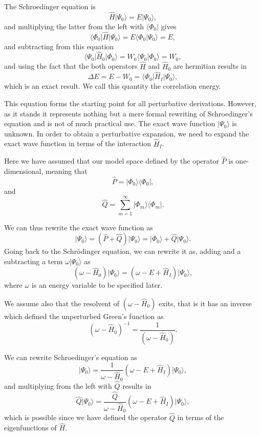 The Schroedinger equation is
\[
\hat{H}\vert \Psi_0\rangle = E\vert \Psi_0\rangle,
\]
and multiplying the latter from the left with $\langle \Phi_0\vert $ gives
\[
\langle \Phi_0\vert \hat{H}\vert \Psi_0\rangle = E\langle \Phi_0\vert \Psi_0\rangle=E,
\]
and subtracting from this equation
\[
\langle \Psi_0\vert \hat{H}_0\vert \Phi_0\rangle= W_0\langle \Psi_0\vert \Phi_0\rangle=W_0,
\]
and using the fact that the both operators $\hat{H}$ and $\hat{H}_0$ are hermitian 
results in
\[
\Delta E=E-W_0=\langle \Phi_0\vert \hat{H}_I\vert \Psi_0\rangle,
\]
which is an exact result. We call this quantity the correlation energy.



This equation forms the starting point for all perturbative derivations. However,
as it stands it represents nothing but a mere formal rewriting of Schroedinger's equation and is not of much practical use. The exact wave function $\vert \Psi_0\rangle$ is unknown. In order to obtain a perturbative expansion, we need to expand the exact wave function in terms of the interaction $\hat{H}_I$. 

Here we have assumed that our model space defined by the operator $\hat{P}$ is one-dimensional, meaning that
\[
\hat{P}= \vert \Phi_0\rangle \langle \Phi_0\vert ,
\]
and
\[
\hat{Q}=\sum_{m=1}^{\infty}\vert \Phi_m\rangle \langle \Phi_m\vert .
\]


We can thus rewrite the exact wave function as
\[
\vert \Psi_0\rangle= (\hat{P}+\hat{Q})\vert \Psi_0\rangle=\vert \Phi_0\rangle+\hat{Q}\vert \Psi_0\rangle.
\]
Going back to the Schr\"odinger equation, we can rewrite it as, adding and a subtracting a term $\omega \vert \Psi_0\rangle$ as
\[
\left(\omega-\hat{H}_0\right)\vert \Psi_0\rangle=\left(\omega-E+\hat{H}_I\right)\vert \Psi_0\rangle,
\]
where $\omega$ is an energy variable to be specified later. 


We assume also that the resolvent of $\left(\omega-\hat{H}_0\right)$ exits, that is
it has an inverse which defined the unperturbed Green's function as
\[
\left(\omega-\hat{H}_0\right)^{-1}=\frac{1}{\left(\omega-\hat{H}_0\right)}.
\]

We can rewrite Schroedinger's equation as
\[
\vert \Psi_0\rangle=\frac{1}{\omega-\hat{H}_0}\left(\omega-E+\hat{H}_I\right)\vert \Psi_0\rangle,
\]
and multiplying from the left with $\hat{Q}$ results in
\[
\hat{Q}\vert \Psi_0\rangle=\frac{\hat{Q}}{\omega-\hat{H}_0}\left(\omega-E+\hat{H}_I\right)\vert \Psi_0\rangle,
\]
which is possible since we have defined the operator $\hat{Q}$ in terms of the eigenfunctions of $\hat{H}$.




